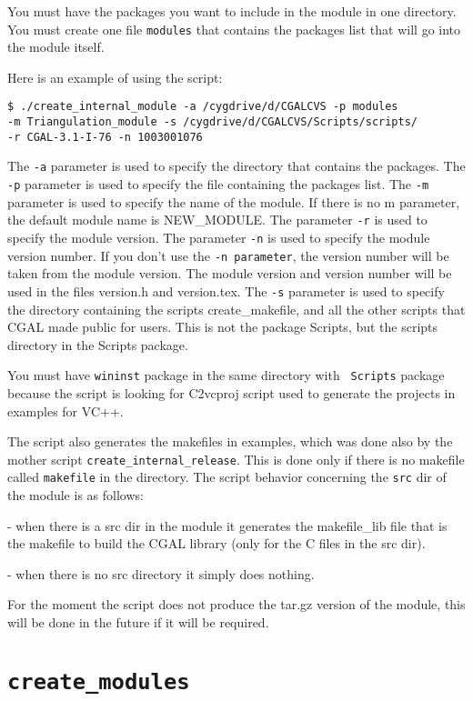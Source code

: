 You must have the packages you want to include in the module in one directory. 
You must create one file {\tt modules} that contains the packages list that 
will go into the module itself.

Here is an example of using the script:
\begin{verbatim}
$ ./create_internal_module -a /cygdrive/d/CGALCVS -p modules 
-m Triangulation_module -s /cygdrive/d/CGALCVS/Scripts/scripts/
-r CGAL-3.1-I-76 -n 1003001076 
\end{verbatim}


The {\tt -a} parameter is used to specify the directory that contains the packages. 
The {\tt -p} parameter is used to specify the file containing the packages list. 
The {\tt -m} parameter is used to specify the name of the module. If there is no m parameter, the default module name is NEW\_MODULE.   
The parameter {\tt -r} is used to specify the module version. 
The parameter {\tt -n} is used to specify the module version number. If you don't use the {\tt -n parameter}, the version number will be taken from the module version. The module version and version number will be used in the files version.h and version.tex. 
The {\tt -s} parameter is used to specify the directory containing the scripts create\_makefile, and all the other scripts that CGAL made public for users. This is not the package Scripts, but the scripts directory in the Scripts package.  

You must have {\tt wininst} package in the same directory with {\tt
  Scripts} package because the script is looking for C2vcproj script
used to generate the projects in examples for VC++.

The script also generates the makefiles in examples, which was done
also by the mother script {\tt create\_internal\_release}. This is
done only if there is no makefile called {\tt makefile} in the
directory.  The script behavior concerning the {\tt src} dir of the
module is as follows:

- when there is a src dir in the module it generates the makefile\_lib
file that is the makefile to build the CGAL library (only for the C
files in the src dir).

  - when there is no src directory it simply does nothing.
  
  For the moment the script does not produce the tar.gz version of the
  module, this will be done in the future if it will be required.
  


\section{{\tt create\_modules}}
\label{sec:create_modules}

